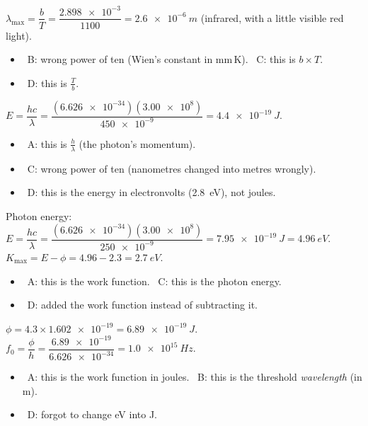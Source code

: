\documentclass[12pt]{article}
\begin{document}
\begin{practiceanswers}
\begin{practiceans}
  $\lambda_\mathrm{max} = \dfrac{b}{T} = \dfrac{\num{2.898e-3}}{1100} = \qty{2.6e-6}{m}$ (infrared, with
  a little visible red light).
  \begin{itemize}
    \item \xmark\ B: wrong power of ten (Wien's constant in mm\,K). \quad \xmark\ C: this is $b \times T$.
    \item \xmark\ D: this is $\frac{T}{b}$.
  \end{itemize}
\end{practiceans}

\begin{practiceans}
  $E = \dfrac{hc}{\lambda} = \dfrac{(\num{6.626e-34})(\num{3.00e8})}{\num{450e-9}} = \qty{4.4e-19}{J}$.
  \begin{itemize}
    \item \xmark\ A: this is $\frac{h}{\lambda}$ (the photon's momentum).
    \item \xmark\ C: wrong power of ten (nanometres changed into metres wrongly).
    \item \xmark\ D: this is the energy in electronvolts (\qty{2.8}{eV}), not joules.
  \end{itemize}
\end{practiceans}

\begin{practiceans}
  Photon energy: $E = \dfrac{hc}{\lambda} = \dfrac{(\num{6.626e-34})(\num{3.00e8})}{\num{250e-9}}
  = \qty{7.95e-19}{J} = \qty{4.96}{eV}$. \quad $K_\mathrm{max} = E - \phi = 4.96 - 2.3 = \qty{2.7}{eV}$.
  \begin{itemize}
    \item \xmark\ A: this is the work function. \quad \xmark\ C: this is the photon energy.
    \item \xmark\ D: added the work function instead of subtracting it.
  \end{itemize}
\end{practiceans}

\begin{practiceans}
  $\phi = 4.3 \times \num{1.602e-19} = \qty{6.89e-19}{J}$. \quad
  $f_0 = \dfrac{\phi}{h} = \dfrac{\num{6.89e-19}}{\num{6.626e-34}} = \qty{1.0e15}{Hz}$.
  \begin{itemize}
    \item \xmark\ A: this is the work function in joules. \quad \xmark\ B: this is the threshold
          \emph{wavelength} (in m).
    \item \xmark\ D: forgot to change eV into J.
  \end{itemize}
\end{practiceans}


\end{practiceanswers}
\end{document}
